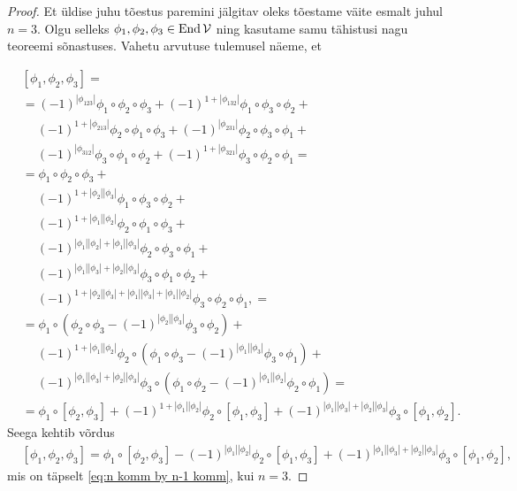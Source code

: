 \begin{proof}
    Et üldise juhu tõestus paremini jälgitav oleks tõestame väite
    esmalt juhul $n=3$. Olgu selleks
    $\phi_1, \phi_2, \phi_3 \in \operatorname{End} \mathcal{V}$ ning kasutame samu
    tähistusi nagu teoreemi sõnastuses. Vahetu arvutuse tulemusel
    näeme, et

    \begin{align*}
        &[\phi_1, \phi_2, \phi_3] = \\
        &= (-1)^{|\phi_{123}|} \phi_1 \circ \phi_2 \circ \phi_3 +
        (-1)^{1 + |\phi_{132}|} \phi_1 \circ \phi_3 \circ \phi_2 + \\
        &\ \quad (-1)^{1 + |\phi_{213}|}
            \phi_2 \circ \phi_1 \circ \phi_3 +
        (-1)^{|\phi_{231}|} \phi_2 \circ \phi_3 \circ \phi_1 + \\
        &\ \quad (-1)^{|\phi_{312}|} \phi_3 \circ \phi_1 \circ \phi_2 +
        (-1)^{1 + |\phi_{321}|} \phi_3 \circ \phi_2 \circ \phi_1 = \\
        &= \phi_1 \circ \phi_2 \circ \phi_3 + \\
        &\ \quad (-1)^{1 + |\phi_2||\phi_3|}
            \phi_1 \circ \phi_3 \circ \phi_2 + \\
        &\ \quad (-1)^{1 + |\phi_1||\phi_2|}
            \phi_2 \circ \phi_1 \circ \phi_3 + \\
        &\ \quad (-1)^{|\phi_1||\phi_2|+|\phi_1||\phi_3|}
            \phi_2 \circ \phi_3 \circ \phi_1 + \\
        &\ \quad (-1)^{|\phi_1||\phi_3|+|\phi_2||\phi_3|}
            \phi_3 \circ \phi_1 \circ \phi_2 + \\
        &\ \quad (-1)^{
                1 + |\phi_2||\phi_3|+|\phi_1||\phi_3|+|\phi_1||\phi_2|
            } \phi_3 \circ \phi_2 \circ \phi_1, = \\
        &= \phi_1 \circ \left(
            \phi_2 \circ \phi_3 -
            (-1)^{|\phi_2||\phi_3|} \phi_3 \circ \phi_2
        \right) + \\
        &\ \quad (-1)^{1 + |\phi_1||\phi_2|} \phi_2 \circ \left(
            \phi_1 \circ \phi_3 -
            (-1)^{|\phi_1||\phi_3|} \phi_3 \circ \phi_1
        \right) + \\
        &\ \quad (-1)^{|\phi_1||\phi_3|+|\phi_2||\phi_3|} \phi_3 \circ
        \left(
            \phi_1 \circ \phi_2 -
            (-1)^{|\phi_1||\phi_2|} \phi_2 \circ \phi_1
        \right) = \\
        &= \phi_1 \circ [\phi_2, \phi_3] +
            (-1)^{1 + |\phi_1||\phi_2|} \phi_2 \circ [\phi_1, \phi_3] +
            (-1)^{|\phi_1||\phi_3|+|\phi_2||\phi_3|}
            \phi_3 \circ [\phi_1, \phi_2].
    \end{align*}
    Seega kehtib võrdus
    \begin{align*}
        &[\phi_1, \phi_2, \phi_3] =
        \phi_1 \circ [\phi_2, \phi_3] -
        (-1)^{|\phi_1||\phi_2|} \phi_2 \circ [\phi_1, \phi_3] +
        (-1)^{|\phi_1||\phi_3| + |\phi_2||\phi_3|}
            \phi_3 \circ [\phi_1, \phi_2],
    \end{align*}
    mis on täpselt \eqref{eq:n komm by n-1 komm}, kui $n = 3$.


\end{proof}

